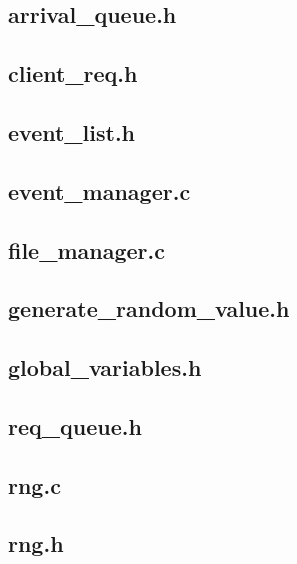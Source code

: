 \subsection{arrival\_queue.h}


\subsection{client\_req.h}


\subsection{event\_list.h}


\subsection{event\_manager.c}


\subsection{file\_manager.c}


\subsection{generate\_random\_value.h}


\subsection{global\_variables.h}


\subsection{req\_queue.h}


\subsection{rng.c}


\subsection{rng.h}


